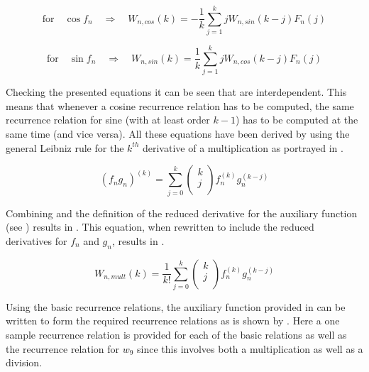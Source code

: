 \begin{equation} \label{eq:recRel6}
\text{for} \quad \cos f_{n} \quad \Rightarrow \quad W_{n,cos}\left(k\right)= -\dfrac{1}{k}\displaystyle\sum_{j=1}^{k}jW_{n,sin}\left(k-j\right)F_{n}\left(j\right)
\end{equation}

\begin{equation} \label{eq:recRel7}
\text{for} \quad \sin f_{n}  \quad \Rightarrow \quad W_{n,sin}\left(k\right)= \dfrac{1}{k}\displaystyle\sum_{j=1}^{k}jW_{n,cos}\left(k-j\right)F_{n}\left(j\right)
\end{equation}

Checking the presented equations it can be seen that  are interdependent. This means that whenever a cosine recurrence relation has to be computed, the same recurrence relation for sine (with at least order $k-1$) has to be computed at the same time (and vice versa). All these equations have been derived by \cite{jorba2005software} using the general Leibniz rule for the $k^{th}$ derivative of a multiplication as portrayed in .

\begin{equation} \label{eq:Leibniz}
\left(f_{n}g_{n}\right)^{\left( k\right)}=\displaystyle\sum_{j=0}^{k}
\left(
\begin{matrix}
k\\
j\\
\end{matrix}
\right)
f_{n}^{\left( k\right)}g_{n}^{\left( k-j\right)}
\end{equation}

Combining  and the definition of the reduced derivative for the auxiliary function (see ) results in . This equation, when rewritten to include the reduced derivatives for $f_{n}$ and $g_{n}$, results in .

\begin{equation} \label{eq:LeibnizInt}
W_{n,mult}\left(k\right)=\dfrac{1}{k!}\displaystyle\sum_{j=0}^{k}
\left(
\begin{matrix}
k\\
j\\
\end{matrix}
\right)
f_{n}^{\left( k\right)}g_{n}^{\left( k-j\right)}
\end{equation}

Using the basic recurrence relations, the auxiliary function provided in  can be written to form the required recurrence relations as is shown by . Here a one sample recurrence relation is provided for each of the basic relations as well as the recurrence relation for $w_{9}$ since this involves both a multiplication as well as a division.


